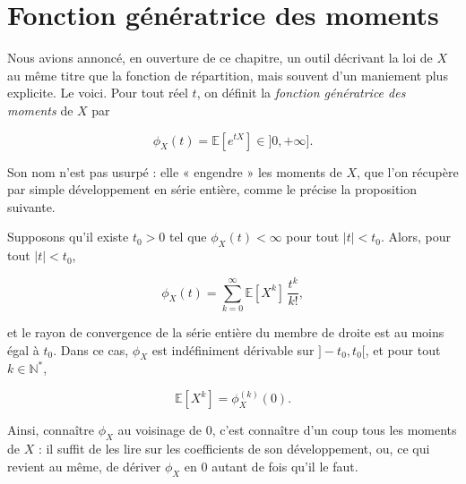 \section{Fonction génératrice des moments}

Nous avions annoncé, en ouverture de ce chapitre, un outil décrivant la loi de $X$ au même titre que la fonction de répartition, mais souvent d'un maniement plus explicite. Le voici. Pour tout réel $t$, on définit la \emph{fonction génératrice des moments} de $X$ par

$$
\phi_X(t) = \mathbb{E}[e^{tX}] \in ]0, +\infty].
$$

Son nom n'est pas usurpé : elle « engendre » les moments de $X$, que l'on récupère par simple développement en série entière, comme le précise la proposition suivante.

\medskip

\begin{mdframed}
\begin{proposition}
Supposons qu'il existe $t_0 > 0$ tel que $\phi_X(t) < \infty$ pour tout $|t| < t_0$. Alors, pour tout $|t| < t_0$,

$$
\phi_X(t) = \sum_{k=0}^\infty \mathbb{E}[X^k]\, \frac{t^k}{k!},
$$

et le rayon de convergence de la série entière du membre de droite est au moins égal à $t_0$. Dans ce cas, $\phi_X$ est indéfiniment dérivable sur $]-t_0, t_0[$, et pour tout $k \in \mathbb{N}^*$,

$$
\mathbb{E}[X^k] = \phi_X^{(k)}(0).
$$
\end{proposition}
\end{mdframed}

Ainsi, connaître $\phi_X$ au voisinage de $0$, c'est connaître d'un coup tous les moments de $X$ : il suffit de les lire sur les coefficients de son développement, ou, ce qui revient au même, de dériver $\phi_X$ en $0$ autant de fois qu'il le faut.

